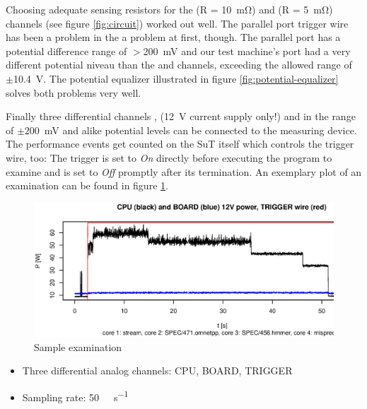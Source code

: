 Choosing adequate sensing resistors for the  (R =
\SI{10}{\milli\ohm}) and  (R = \SI{5}{\milli\ohm}) channels (see
figure \ref{fig:circuit}) worked out well. The parallel port trigger wire has
been a problem in the a problem at first, though. The parallel port has a
potential difference range of $>$\SI{200}{\milli\volt} and our test machine's
port had a very different potential niveau than the  and
 channels, exceeding the allowed range of $\pm$\SI{10.4}{\volt}.
The potential equalizer illustrated in figure \ref{fig:potential-equalizer}
solves both problems very well.

Finally three differential channels ,  (\SI{12}{\volt}
current supply only!) and  in the range of
$\pm$\SI{200}{\milli\volt} and alike potential levels can be connected to the
measuring device. The performance events get counted on the SuT itself which
controls the trigger wire, too: The trigger is set to \emph{On} directly before
executing the program to examine and is set to \emph{Off} promptly after its
termination. An exemplary plot of an examination can be found in figure
\ref{fig:cpu-power-trig}.

\begin{figure}
  \centering
    \includegraphics[width=\textwidth]{fig/cpu-power-trig.eps}
  \caption{Sample examination}
  \label{fig:cpu-power-trig}
\end{figure}


\begin{itemize}

\item Three differential analog channels: CPU, BOARD, TRIGGER

\item Sampling rate: \SI{50}{\kilo\samples\per\second}

\end{itemize}


